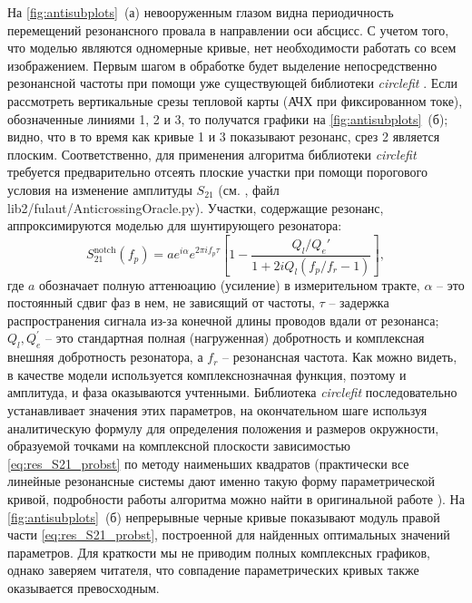 \documentclass[14pt, a4paper]{extreport}
\numberwithin{equation}{section}
\begin{document}
На \autoref{fig:antisubplots}~(а) невооруженным глазом видна периодичность перемещений резонансного провала в направлении оси абсцисс. С учетом того, что моделью являются одномерные кривые, нет необходимости работать со всем изображением. Первым шагом в обработке будет выделение непосредственно резонансной частоты при помощи уже существующей библиотеки \foreignlanguage{english}{\textit{circlefit}} \cite{probst2015efficient}. Если рассмотреть вертикальные срезы тепловой карты (АЧХ при фиксированном токе), обозначенные линиями 1, 2 и 3, то получатся графики на \autoref{fig:antisubplots}~(б); видно, что в то время как кривые 1 и 3 показывают резонанс, срез 2 является плоским. Соответственно, для применения алгоритма библиотеки \foreignlanguage{english}{\textit{circlefit}} требуется предварительно отсеять плоские участки при помощи порогового условия на изменение амплитуды $S_{21}$ (см. \cite{fedorov2021github}, файл \foreignlanguage{english}{lib2/fulaut/AnticrossingOracle.py}). Участки, содержащие резонанс, аппроксимируются моделью для шунтирующего резонатора:
\begin{equation}
	S_{21}^\text{notch}(f_p) = ae^{i\alpha}e^{2\pi if_p\tau} \left[1-\frac{Q_l/Q_e'}{1+2iQ_l(f_p/f_r-1)}\right],
	\label{eq:res_S21_probst}
\end{equation}
где $a$ обозначает полную аттенюацию (усиление) в измерительном тракте, $\alpha$ -- это постоянный сдвиг фаз в нем, не зависящий от частоты, $\tau$ -- задержка распространения сигнала из-за конечной длины проводов вдали от резонанса; $Q_l, Q_e^\prime$ -- это стандартная полная (нагруженная) добротность и комплексная \cite{khalil2012} внешняя добротность резонатора, а $f_r$ -- резонансная частота. Как можно видеть, в качестве модели используется комплекснозначная функция, поэтому и амплитуда, и фаза оказываются учтенными. Библиотека \foreignlanguage{english}{\textit{circlefit}} последовательно устанавливает значения этих параметров, на окончательном шаге используя аналитическую формулу для определения положения и размеров окружности, образуемой точками на комплексной плоскости зависимостью \eqref{eq:res_S21_probst} по методу наименьших квадратов (практически все линейные резонансные системы дают именно такую форму параметрической кривой, подробности работы алгоритма можно найти в оригинальной работе \cite{probst2015efficient}). На \autoref{fig:antisubplots}~(б) непрерывные черные кривые показывают модуль правой части \eqref{eq:res_S21_probst}, построенной для найденных оптимальных значений параметров. Для краткости мы не приводим полных комплексных графиков, однако заверяем читателя, что совпадение параметрических кривых также оказывается превосходным.
\end{document}
